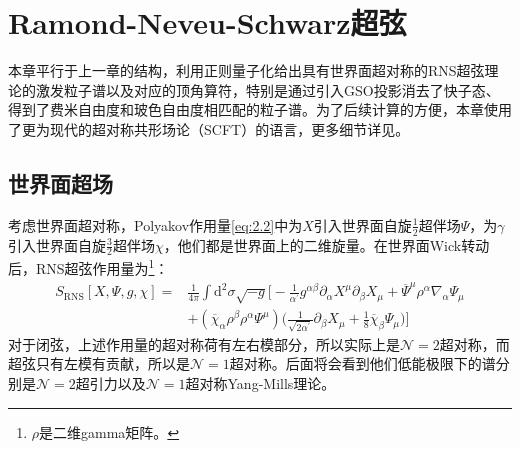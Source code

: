 \chapter{Ramond-Neveu-Schwarz超弦}
\label{chap:3}
本章平行于上一章的结构，利用正则量子化给出具有世界面超对称的RNS超弦理论的激发粒子谱以及对应的顶角算符，特别是通过引入GSO投影消去了快子态、得到了费米自由度和玻色自由度相匹配的粒子谱。为了后续计算的方便，本章使用了更为现代的超对称共形场论（SCFT）的语言，更多细节详见\cite{Green:2012oqa,Green:2012pqa,Polchinski:1998rr}。
\section{世界面超场}
考虑世界面超对称，Polyakov作用量\ref{eq:2.2}中为$X$引入世界面自旋$\frac12$超伴场$\Psi$，为$\gamma$引入世界面自旋$\frac32$超伴场$\chi$，他们都是世界面上的二维旋量。在世界面Wick转动后，RNS超弦作用量为\footnote{$\rho$是二维gamma矩阵。}：
\begin{equation}
	\begin{aligned}
		S_{\mathrm{RNS}}[X,\Psi,g,\chi]=&\frac1{4\pi}\int\mathrm{d}^2\sigma\sqrt{-g}\Big[-\frac1{\alpha^{\prime}}g^{\alpha\beta}\partial_\alpha X^\mu\partial_\beta X_\mu+\overline{\Psi}^\mu\rho^\alpha\nabla_\alpha\Psi_\mu\\&+(\overline{\chi}_\alpha\rho^\beta\rho^\alpha\Psi^\mu)\Big(\frac1{\sqrt{2\alpha^{\prime}}}\partial_\beta X_\mu+\frac18\overline{\chi}_\beta\Psi_\mu\Big)\Big]
	\end{aligned}
\end{equation}
对于闭弦，上述作用量的超对称荷有左右模部分，所以实际上是$\mathcal{N}=2$超对称，而超弦只有左模有贡献，所以是$\mathcal{N}=1$超对称。后面将会看到他们低能极限下的谱分别是$\mathcal{N}=2$超引力以及$\mathcal{N}=1$超对称Yang-Mills理论。

